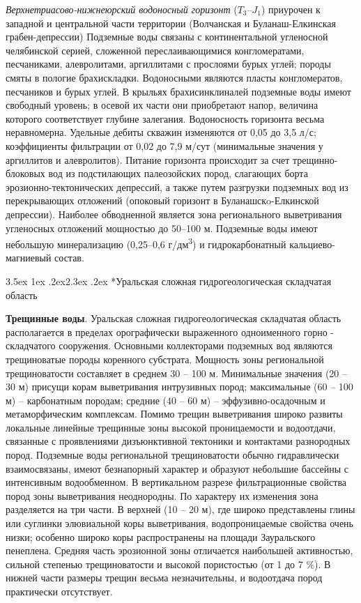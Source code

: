 \documentclass[a4paper,12pt]{article} %
\makeatletter
\renewcommand\section{\@startsection {section}{1}{\parindent}%
	{3.5ex \@plus 1ex \@minus .2ex}{2.3ex \@plus.2ex}%
	{\normalfont\hyphenpenalty=10000\Large\bfseries}}
\makeatother
\begin{document}
\textit{Верхнетриасово-нижнеюрский водоносный горизонт} ($T_3–J_1$) приурочен к западной и центральной части территории (Волчанская и Буланаш-Елкинская грабен-депрессии) Подземные воды связаны с континентальной угленосной челябинской серией, сложенной переслаивающимися конгломератами, песчаниками, алевролитами, аргиллитами с прослоями бурых углей; породы смяты в пологие брахискладки. Водоносными являются пласты конгломератов, песчаников и бурых углей. В крыльях брахисинклиналей подземные воды имеют свободный уровень; в осевой их части они приобретают напор, величина которого соответствует глубине залегания. Водоносность горизонта весьма неравномерна. Удельные дебиты скважин изменяются от 0,05 до 3,5 л/с; коэффициенты фильтрации от 0,02 до 7,9 м/сут (минимальные значения у аргиллитов и алевролитов). Питание горизонта происходит за счет трещинно-блоковых вод из подстилающих палеозойских пород, слагающих борта эрозионно-тектонических депрессий, а также путем разгрузки подземных вод из перекрывающих отложений (опоковый горизонт в Буланашскo-Елкинской депрессии). Наиболее обводненной является зона регионального выветривания угленосных отложений мощностью до 50–100 м. Подземные воды имеют небольшую минерализацию (0,25–0,6 г/дм\textsuperscript{3}) и гидрокарбонатный кальциево-магниевый состав.


\section*{Уральская сложная гидрогеологическая складчатая область}

\textbf{Трещинные воды}. Уральская сложная гидрогеологическая складчатая область располагается в пределах орографически выраженного одноименного горно - складчатого сооружения. Основными коллекторами подземных вод являются трещиноватые породы коренного субстрата. Мощность зоны региональной трещиноватости составляет в среднем 30 – 100 м. Минимальные значения (20 – 30 м) присущи корам выветривания интрузивных пород; максимальные (60 – 100 м) – карбонатным породам; средние (40 – 60 м) – эффузивно-осадочным и метаморфическим комплексам. Помимо трещин выветривания широко развиты локальные линейные трещинные зоны высокой проницаемости и водоотдачи, связанные с проявлениями дизъюнктивной тектоники и контактами разнородных пород. Подземные воды региональной трещиноватости обычно гидравлически взаимосвязаны, имеют безнапорный характер и образуют небольшие бассейны с интенсивным
водообменном. В вертикальном разрезе фильтрационные свойства пород зоны выветривания неоднородны. По характеру их изменения зона разделяется на три части. В верхней (10 – 20 м), где широко представлены глины или суглинки элювиальной коры выветривания, водопроницаемые свойства очень низки; особенно широко коры распространены на площади Зауральского пенеплена. Средняя часть эрозионной зоны отличается наибольшей активностью, сильной степенью трещиноватости и высокой пористостью (от 1 до 7 \%). В нижней части размеры трещин весьма незначительны, и водоотдача пород практически отсутствует.
\end{document}
